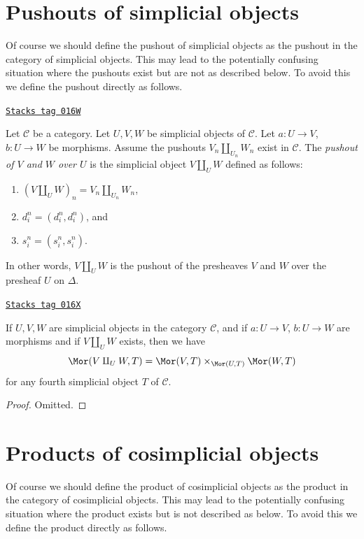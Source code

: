 \section{Pushouts of simplicial objects}
\label{simplicial-section-push-outs}
Of course we should define the pushout of simplicial objects
as the pushout in the category of simplicial objects. This
may lead to the potentially confusing situation where the
pushouts exist but are not as described below. To avoid
this we define the pushout directly as follows.

\begin{definition}
\label{simplicial-definition-push-out}
\href{https://stacks.math.columbia.edu/tag/016W}{\texttt{Stacks tag 016W}}

Let $\mathcal{C}$ be a category.
Let $U, V, W$ be simplicial objects of $\mathcal{C}$.
Let $a : U \to V$, $b : U \to W$ be morphisms.
Assume the pushouts $V_n \amalg_{U_n} W_n$ exist in $\mathcal{C}$.
The {\it pushout of $V$ and $W$ over $U$} is the simplicial object
$V\amalg_U W$ defined as follows:
\begin{enumerate}
\item $(V \amalg_U W)_n = V_n \amalg_{U_n} W_n$,
\item $d^n_i = (d^n_i, d^n_i)$, and
\item $s^n_i = (s^n_i, s^n_i)$.
\end{enumerate}
In other words, $V\amalg_U W$ is the pushout of the presheaves
$V$ and $W$ over the presheaf $U$ on $\Delta$.
\end{definition}

\begin{lemma}
\label{simplicial-lemma-push-out}
\href{https://stacks.math.columbia.edu/tag/016X}{\texttt{Stacks tag 016X}}

If $U, V, W$ are simplicial objects in the category $\mathcal{C}$,
and if $a : U \to V$, $b : U \to W$ are morphisms
and if $V\amalg_U W$ exists, then we have
$$
\Mor(V\amalg_U W, T) =
\Mor(V, T) \times_{\Mor(U, T)}
\Mor(W, T)
$$
for any fourth simplicial object $T$ of $\mathcal{C}$.
\end{lemma}

\begin{proof}
Omitted.
\end{proof}

\section{Products of cosimplicial objects}
\label{simplicial-section-products-cosimplicial}
Of course we should define the product of cosimplicial objects
as the product in the category of cosimplicial objects. This
may lead to the potentially confusing situation where the product exists
but is not described as below. To avoid this we define the product
directly as follows.

